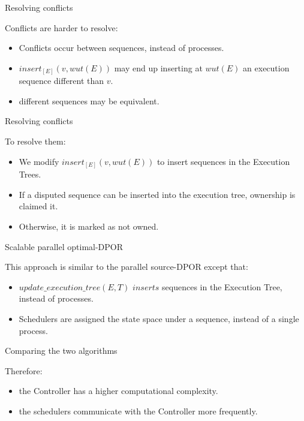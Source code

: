 \documentclass[9pt]{beamer}
\begin{document}
\begin{frame} {Resolving conflicts}

Conflicts are harder to resolve:

\begin{itemize}[<+->]
\item Conflicts occur between sequences, instead of processes.
\item $insert_{[E]}(v,wut(E))$ may end up inserting at $wut(E)$ an execution sequence different than $v$.
\item different sequences may be equivalent.

\end{itemize}

\end{frame}

\begin{frame} {Resolving conflicts}

To resolve them:

\begin{itemize}[<+->]
\item We modify $insert_{[E]}(v,wut(E))$ to insert sequences in the Execution Trees.
\item If a disputed sequence can be inserted into the execution tree, ownership is claimed it.
\item Otherwise, it is marked as not owned.

\end{itemize}

\end{frame}


\begin{frame} {Scalable parallel optimal-DPOR}

This approach is similar to the parallel source-DPOR except that:

\begin{itemize}[<+->]

\item $update\_execution\_tree(E, T)$ $inserts$ sequences in the Execution Tree, instead of processes.
\item Schedulers are assigned the state space under a sequence, instead of a single process.

\end{itemize}

\end{frame}

\begin{frame} {Comparing the two algorithms}

Therefore:

\begin{itemize}[<+->]

\item the Controller has a higher computational complexity.
\item the schedulers communicate with the Controller more frequently.

\end{itemize}



\end{frame}
\end{document}
